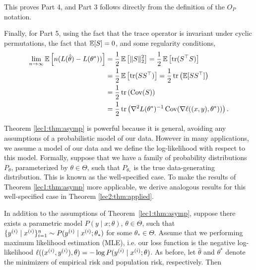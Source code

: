This proves Part 4, and Part 3 follows directly from the definition of the $O_P$ notation.

Finally, for Part 5, using the fact that the trace operator is invariant under cyclic permutations, the fact that $\Exp [S] = 0$, and some regularity conditions,
\begin{align}
    \lim_{n \to \infty} \Exp \left[ n (L(\hat \theta) - L(\theta^*)) \right] &= \frac12 \Exp\left[ \|S\|_2^2 \right] = \frac12 \Exp \left[ \tr(S^\top S) \right] \\
    &= \frac12 \Exp \left[ \tr(S S^\top) \right]  = \frac12 \tr \left(\Exp[S S^\top] \right) \\
    &= \frac12 \tr \left( \Cov(S) \right) \\
    &= \frac12 \tr\left( \nabla^2 L(\theta^*)^{-1} \Cov(\nabla \ell ((x, y), \theta^*)) \right).
\end{align}


Theorem \ref{lec1:thm:asymp} is powerful because it is general, avoiding any assumptions of a probabilistic model of our data. However in many applications, we assume a model of our data and we define the log-likelihood with respect to this model. Formally, suppose that we have a family of probability distributions $P_\theta$, parameterized by $\theta \in \Theta$, such that $P_{\theta_*}$ is the true data-generating distribution. This is known as the well-specified case. To make the results of Theorem \ref{lec1:thm:asymp} more applicable, we derive analogous results for this well-specified case in Theorem \ref{lec2:thm:applied}.

\begin{theorem}
\label{lec2:thm:applied}
    In addition to the assumptions of Theorem~\ref{lec1:thm:asymp}, suppose there exists a parametric model $P(y \mid x; \theta)$, $\theta \in \Theta$, such that $\{ y\sp{i} \mid x\sp{i} \}_{i=1}^n \sim P( y\sp{i} \mid x\sp{i} ; \theta_*)$ for some $\theta_* \in \Theta$. Assume that we performing maximum likelihood estimation (MLE), i.e. our loss function is the negative log-likelihood $\ell((x\sp{i}, y\sp{i}), \theta) = - \log P( y\sp{i} \mid x\sp{i} ; \theta)$. As before, let $\hat\theta$ and $\theta^*$ denote the minimizers of empirical risk and population risk, respectively. Then
    \al{
    \label{lec2:eqn:applied1}
        \theta^* = \theta_*,
    }
\end{theorem}

